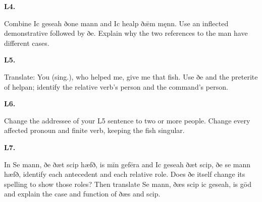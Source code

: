 \par\begin{minipage}{\linewidth}\raggedright
\textbf{L4.}

Combine Ic geseah ðone mann and Ic healp ðǣm męnn. Use an inflected demonstrative followed by ðe. Explain why the two references to the man have different cases.

\end{minipage}\par\addvspace{4pt}

\par\begin{minipage}{\linewidth}\raggedright
\textbf{L5.}

Translate: You (sing.), who helped me, give me that fish. Use ðe and the preterite of helpan; identify the relative verb’s person and the command’s person.

\end{minipage}\par\addvspace{4pt}

\par\begin{minipage}{\linewidth}\raggedright
\textbf{L6.}

Change the addressee of your L5 sentence to two or more people. Change every affected pronoun and finite verb, keeping the fish singular.

\end{minipage}\par\addvspace{4pt}

\par\begin{minipage}{\linewidth}\raggedright
\textbf{L7.}

In Se mann, ðe ðæt scip hæfð, is mīn gefēra and Ic geseah ðæt scip, ðe se mann hæfð, identify each antecedent and each relative role. Does ðe itself change its spelling to show those roles? Then translate Se mann, ðæs scip ic geseah, is gōd and explain the case and function of ðæs and scip.

\end{minipage}\par\addvspace{4pt}


